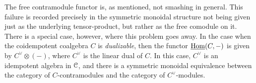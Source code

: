 \begin{remark}
    The free contramodule functor is, as mentioned, not smashing in general. This failure is recorded precisely in the symmetric monoidal structure not being given just as the underlying tensor-product, but rather as the free comodule on it. There is a special case, however, where this problem goes away. In the case when the coidempotent coalgebra $C$ is \emph{dualizable}, then the functor $\operatorname{\underline{Hom}}(C,-)$ is given by $C^\vee \otimes (-)$, where $C^\vee$ is the linear dual of $C$. In this case, $C^\vee$ is an idempotent algebra in $\EuScript{C}$, and there is a symmetric monoidal equivalence between the category of $C$-contramodules and the category of $C^\vee$-modules. 
\end{remark}







